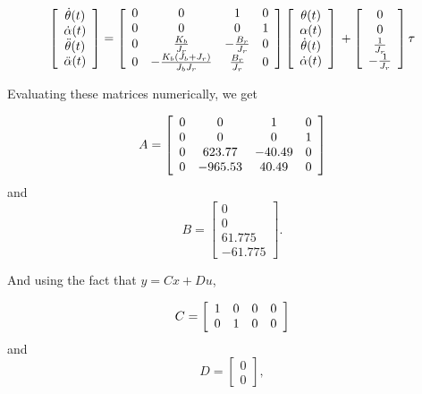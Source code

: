 \[
    \left[\begin{array}{c}
            \dot{\theta}(t)  \\
            \dot{\alpha}(t)  \\
            \ddot{\theta}(t) \\
            \ddot{\alpha}(t)
        \end{array}\right] =
    \left[\begin{array}{c c c c}
            0 & 0                                          & 1                & 0 \\
            0 & 0                                          & 0                & 1 \\
            0 & \frac{K_b}{J_r}                            & -\frac{B_r}{J_r} & 0 \\
            0 & -\frac{K_b\left(J_b + J_r\right)}{J_b J_r} & \frac{B_r}{J_r}  & 0
        \end{array}\right]
    \left[\begin{array}{c}
            \theta(t)       \\
            \alpha(t)       \\
            \dot{\theta}(t) \\
            \dot{\alpha}(t)
        \end{array}\right] \\ +
    \left[\begin{array}{c}
            0             \\
            0             \\
            \frac{1}{J_r} \\
            -\frac{1}{J_r}
        \end{array}\right] \tau
\]

Evaluating these matrices numerically, we get

\[
    A =
    \left[\begin{array}{c c c c}
            0 & 0       & 1      & 0 \\
            0 & 0       & 0      & 1 \\
            0 & 623.77  & -40.49 & 0 \\
            0 & -965.53 & 40.49  & 0
        \end{array}\right]
\]
and
\[
    B =
    \left[\begin{array}{c}
            0      \\
            0      \\
            61.775 \\
            -61.775
        \end{array}\right].
\]

And using the fact that \(y = Cx + Du\),

\[
    C =
    \left[\begin{array}{c c c c}
            1 & 0 & 0 & 0 \\
            0 & 1 & 0 & 0
        \end{array}\right]
\]
and
\[
    D =
    \left[\begin{array}{c}
            0 \\
            0
        \end{array}\right],
\]